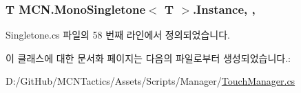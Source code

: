 \subsubsection[{\texorpdfstring{Instance}{Instance}}]{\setlength{\rightskip}{0pt plus 5cm}T {\bf M\+C\+N.\+Mono\+Singletone}$<$ T $>$.Instance\hspace{0.3cm}{\ttfamily [static]}, {\ttfamily [get]}, {\ttfamily [inherited]}}\hypertarget{class_m_c_n_1_1_mono_singletone_aa50c027cca64cf4ad30c1ee5c83e0b78}{}\label{class_m_c_n_1_1_mono_singletone_aa50c027cca64cf4ad30c1ee5c83e0b78}


Singletone.\+cs 파일의 58 번째 라인에서 정의되었습니다.



이 클래스에 대한 문서화 페이지는 다음의 파일로부터 생성되었습니다.\+:\begin{DoxyCompactItemize}
\item 
D\+:/\+Git\+Hub/\+M\+C\+N\+Tactics/\+Assets/\+Scripts/\+Manager/\hyperlink{_touch_manager_8cs}{Touch\+Manager.\+cs}\end{DoxyCompactItemize}
